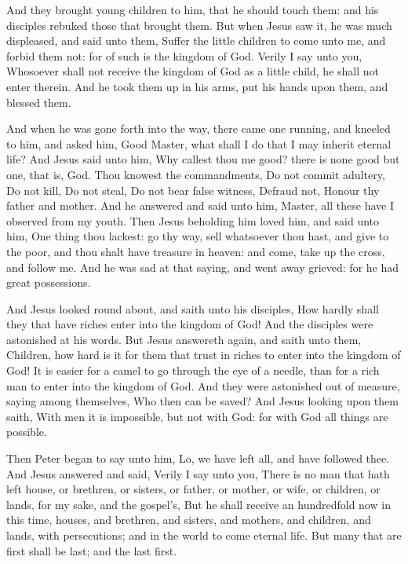  And they brought young children to him, that he should
touch them: and his disciples rebuked those that brought them.
 But when Jesus saw it, he was much displeased, and said
unto them, Suffer the little children to come unto me, and forbid them
not: for of such is the kingdom of God.  Verily I say unto
you, Whosoever shall not receive the kingdom of God as a little child,
he shall not enter therein.  And he took them up in his
arms, put his hands upon them, and blessed them.

 And when he was gone forth into the way, there came one
running, and kneeled to him, and asked him, Good Master, what shall I do
that I may inherit eternal life?  And Jesus said unto him,
Why callest thou me good? there is none good but one, that is, God.
 Thou knowest the commandments, Do not commit adultery, Do
not kill, Do not steal, Do not bear false witness, Defraud not, Honour
thy father and mother.  And he answered and said unto him,
Master, all these have I observed from my youth.  Then
Jesus beholding him loved him, and said unto him, One thing thou
lackest: go thy way, sell whatsoever thou hast, and give to the poor,
and thou shalt have treasure in heaven: and come, take up the cross, and
follow me.  And he was sad at that saying, and went away
grieved: for he had great possessions.

 And Jesus looked round about, and saith unto his
disciples, How hardly shall they that have riches enter into the kingdom
of God!  And the disciples were astonished at his words.
But Jesus answereth again, and saith unto them, Children, how hard is it
for them that trust in riches to enter into the kingdom of God!
 It is easier for a camel to go through the eye of a
needle, than for a rich man to enter into the kingdom of God.
 And they were astonished out of measure, saying among
themselves, Who then can be saved?  And Jesus looking upon
them saith, With men it is impossible, but not with God: for with God
all things are possible.

 Then Peter began to say unto him, Lo, we have left all,
and have followed thee.  And Jesus answered and said,
Verily I say unto you, There is no man that hath left house, or
brethren, or sisters, or father, or mother, or wife, or children, or
lands, for my sake, and the gospel's,  But he shall receive
an hundredfold now in this time, houses, and brethren, and sisters, and
mothers, and children, and lands, with persecutions; and in the world to
come eternal life.  But many that are first shall be last;
and the last first.

